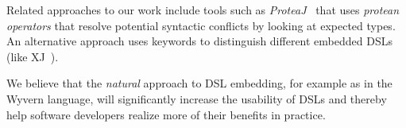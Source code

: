 \documentclass{sigplanconf}
\begin{document}
Related approaches to our work include tools such as \textit{ProteaJ}~\cite{Ichikawa:2014:CUO:2584469.2577092} that uses \textit{protean operators} that resolve potential syntactic conflicts by looking at expected types.  An
alternative approach uses keywords to distinguish different embedded DSLs
(like XJ~\cite{DBLP:conf/scam/ClarkSW08}).

We believe that the \textit{natural} approach to DSL embedding, for example
as in the Wyvern language, will significantly increase the usability of DSLs
and thereby help software developers realize more of their benefits in
practice.




\end{document}
